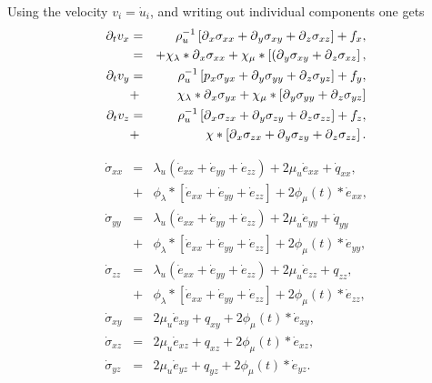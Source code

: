 \documentclass[11pt]{article}
\begin{document}
Using the velocity $v_i = \dot{u}_i$, and writing out individual components one gets
\begin{eqnarray}
  \partial_t{v}_x & = & \rho^{-1}_u\left[\mbox{$\partial$}_x \sigma_{xx} +\mbox{$\partial$}_y \sigma_{xy} 
                                    +\mbox{$\partial$}_z \sigma_{xz}\right] + f_x, \nonumber\\
            & = & + \chi_{\lambda}*\mbox{$\partial$}_x \sigma_{xx} 
                                    +\chi_{\mu}*\left[(\mbox{$\partial$}_y \sigma_{xy} 
                                    +\mbox{$\partial$}_z \sigma_{xz}\right],       \nonumber\\
  \partial_t{v}_y & = & \rho^{-1}_u\left[p_x \sigma_{yx} +\mbox{$\partial$}_y \sigma_{yy} 
                                    +\mbox{$\partial$}_z \sigma_{yz}\right] + f_y, \nonumber\\
            & + & \chi_{\lambda}*\mbox{$\partial$}_x \sigma_{yx} 
                                    +\chi_{\mu}*\left[\mbox{$\partial$}_y \sigma_{yy} 
                                    +\mbox{$\partial$}_z \sigma_{yz}\right]        \nonumber\\
  \partial_t{v}_z & = & \rho^{-1}_u\left[\mbox{$\partial$}_x \sigma_{zx} +\mbox{$\partial$}_y \sigma_{zy} 
                                    +\mbox{$\partial$}_z \sigma_{zz}\right] + f_z, \nonumber\\
            & + & \chi*\left[\mbox{$\partial$}_x \sigma_{zx} +\mbox{$\partial$}_y \sigma_{zy} 
                                    +\mbox{$\partial$}_z \sigma_{zz}\right].
\end{eqnarray}

\begin{eqnarray}
  \dot{\sigma}_{xx} 
     & = & \lambda_u \left (\dot{e}_{xx} 
                 + \dot{e}_{yy} + \dot{e}_{zz}\right)
                 + 2\mu_u \dot{e}_{xx} +\dot{q}_{xx},          \nonumber\\ 
     & + & \phi_{\lambda}*[\dot{e}_{xx}+\dot{e}_{yy}
                 +\dot{e}_{zz}] + 2\phi_{\mu}(t)*\dot{e}_{xx}, \nonumber\\
  \dot{\sigma}_{yy} 
     & = & \lambda_u \left (\dot{e}_{xx} 
                 +\dot{e}_{yy} + \dot{e}_{zz}\right)
                 + 2\mu_u \dot{e}_{yy} +\dot{q}_{yy}           \nonumber\\
     & + & \phi_{\lambda}*[\dot{e}_{xx}+\dot{e}_{yy}
                 +\dot{e}_{zz}] + 2\phi_{\mu}(t)*\dot{e}_{yy}, \nonumber\\
  \dot{\sigma}_{zz} 
    & = & \lambda_u \left (\dot{e}_{xx} 
                + \dot{e}_{yy} + \dot{e}_{zz}\right)
                + 2\mu_u \dot{e}_{zz} +q_{zz},                 \nonumber\\
    & + & \phi_{\lambda}*[\dot{e}_{xx}
                +\dot{e}_{yy}+\dot{e}_{zz}] 
                + 2\phi_{\mu}(t)*\dot{e}_{zz},                 \nonumber\\
  \dot{\sigma}_{xy} 
   & = & 2\mu_u \dot{e}_{xy} +q_{xy} 
                + 2\phi_{\mu}(t)*\dot{e}_{xy},                 \nonumber\\
  \dot{\sigma}_{xz} 
   & = & 2\mu_u \dot{e}_{xz} +q_{xz} 
                + 2\phi_{\mu}(t)*\dot{e}_{xz},                 \nonumber\\
  \dot{\sigma}_{yz} 
   & = & 2\mu_u \dot{e}_{yz} +q_{yz}
               +  2\phi_{\mu}(t)*\dot{e}_{yz}.                 \nonumber\\
\end{eqnarray}
\end{document}
